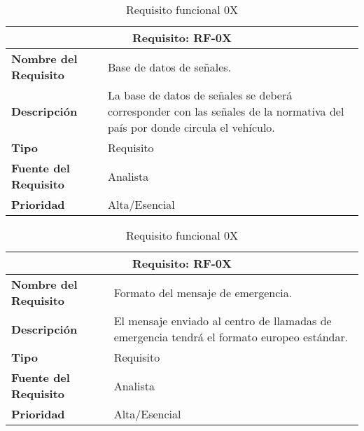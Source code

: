 \begin{table}[H]
\begin{center}
\begin{tabular}{p{} p{7cm}}
\multicolumn{2}{c}{\textbf{Requisito: RF-0X} } \\
\hline \hline
\textbf{Nombre del Requisito} & Base de datos de señales.\\
\hline
\textbf{Descripción} & La base de datos de señales se deberá corresponder con las señales de la normativa del país por donde circula el vehículo.\\
\hline
\textbf{Tipo} & Requisito  \\
\hline
\textbf{Fuente del Requisito} & Analista  \\
\hline
\textbf{Prioridad} & Alta/Esencial \\ \hline
\end{tabular}
\caption{Requisito funcional 0X}
\label{tab:personal}
\end{center}
\end{table}

\begin{table}[H]
\begin{center}
\begin{tabular}{p{} p{7cm}}
\multicolumn{2}{c}{\textbf{Requisito: RF-0X} } \\
\hline \hline
\textbf{Nombre del Requisito} & Formato del mensaje de emergencia.\\
\hline
\textbf{Descripción} & El mensaje enviado al centro de llamadas de emergencia tendrá el formato europeo estándar.\\
\hline
\textbf{Tipo} & Requisito  \\
\hline
\textbf{Fuente del Requisito} & Analista  \\
\hline
\textbf{Prioridad} & Alta/Esencial \\ \hline
\end{tabular}
\caption{Requisito funcional 0X}
\label{tab:personal}
\end{center}
\end{table}
